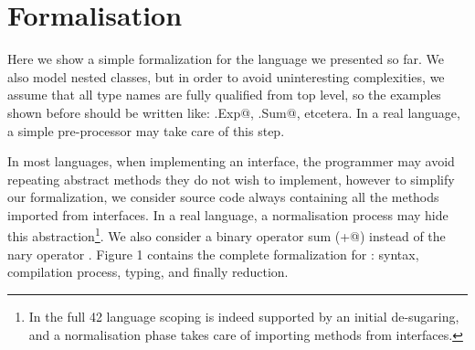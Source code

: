 \saveSpace\section{Formalisation}\label{sec:formal}
\saveSpace

Here we show a simple formalization for the language we presented so far.
We also model nested classes, but in order to avoid uninteresting complexities, we assume that
all type names are fully qualified from top level, so the examples shown before should be
written like: \Q@This.Exp@, \Q@This.Sum@, etcetera.
In a real language, a simple pre-processor may take care of this step.

In most languages, when implementing an interface, the programmer may avoid repeating abstract methods
they do not wish to implement, however
to simplify our formalization, we consider source code always containing all the methods imported from interfaces. In a real language, a normalisation process
may hide this abstraction\footnote{
In the full 42 language scoping is indeed supported by an initial de-sugaring, and a normalisation phase takes care of importing methods from interfaces.
}.
We also consider a binary operator sum (\Q@+@) instead of the nary operator \Q@Use@.
Figure 1 contains the complete formalization for \name: syntax,
compilation process, typing, and finally reduction.




